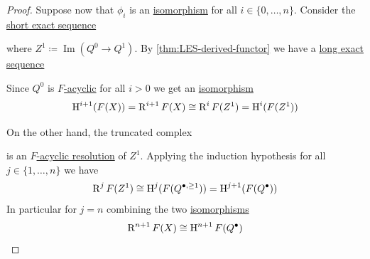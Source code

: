 \documentclass[../../main]{subfiles}
\begin{document}
\begin{proof}
  Suppose now that \(\phi_{i}\) is an \hyperref[def:categorical-isomorphism]{isomorphism} for all \(i \in \{0, \ldots, n\}\).
  Consider the \hyperref[def:exact-sequence]{short exact sequence}
  \begin{center}
  \end{center}
  where \(Z^{1} \coloneq \operatorname{Im}(Q^{0} \to Q^{1})\).
  By \autoref{thm:LES-derived-functor} we have a \hyperref[def:exact-sequence]{long exact sequence}
  \begin{center}
  \end{center}
  Since \(Q^{0}\) is \hyperref[def:F-acyclic-object]{\(F\)-acyclic} for all \(i > 0\) we get an \hyperref[def:categorical-isomorphism]{isomorphism}
  \begin{equation*}
    \operatorname{H}^{i+1}(F(X)) = \operatorname{R}^{i+1}F(X) \cong \operatorname{R}^{i}F(Z^{1}) = \operatorname{H}^{i}(F(Z^{1}))
  \end{equation*}

  On the other hand, the truncated complex
  \begin{center}
  \end{center}
  is an \hyperref[def:F-acyclic-object]{\(F\)-acyclic resolution} of \(Z^{1}\).
  Applying the induction hypothesis for all \(j \in \{1, \ldots, n\}\) we have
  \begin{equation*}
    \operatorname{R}^{j}F(Z^{1}) \cong \operatorname{H}^{j}(F(Q^{\bullet, \geq 1})) = \operatorname{H}^{j+1}(F(Q^{\bullet}))
  \end{equation*}
  In particular for \(j = n\) combining the two \hyperref[def:categorical-isomorphism]{isomorphisms}
  \begin{equation*}
    \operatorname{R}^{n+1}F(X) \cong \operatorname{H}^{n+1}F(Q^{\bullet})
  \end{equation*}


\end{proof}
\end{document}
